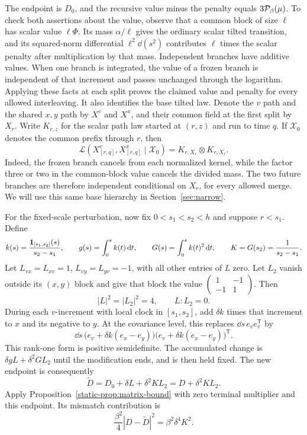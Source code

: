 The endpoint is $D_0$, and the recursive value minus the penalty equals
$3\mathcal P_\beta(\mu)$. To check both assertions about the value, observe
that a common block of size $\ell$ has scalar value $\ell\Phi$.
Its mass $\alpha/\ell$ gives the ordinary scalar tilted transition,
and its squared-norm differential $\ell^2\dd(s^2)$ contributes
$\ell$ times the scalar penalty after multiplication by that mass.
Independent branches have additive values. When one branch is
integrated, the value of a frozen branch is independent of that
increment and passes unchanged through the logarithm. Applying these
facts at each split proves the claimed value and penalty for every
allowed interleaving. It also identifies the base tilted law. Denote the $v$ path and the
shared $x,y$ path by $X^v$ and $X^x$, and their common field at the
first split by $X_r$. Write $K_{r,z}$ for the scalar path law started at $(r,z)$ and run to time $q$.
If $\mathcal X_0$ denotes the common prefix through $r$, then
\begin{equation}\label{static-eq:locking-product-law}
 \mathcal L(X^v_{[r,q]},X^x_{[r,q]}\mid\mathcal X_0)
   =K_{r,X_r}\otimes K_{r,X_r}.
\end{equation}
Indeed, the frozen branch cancels from each normalized kernel, while
the factor three or two in the common-block value cancels the divided
mass. The two future branches are therefore independent conditional on
$X_r$, for every allowed merge. We will use this same base hierarchy
in Section~\ref{sec:narrow}.

For the fixed-scale perturbation, now fix $0<s_1<s_2<h$ and suppose
$r<s_1$. Define
\[
 k(s)=\frac{\mathbf 1_{[s_1,s_2]}(s)}{s_2-s_1},\qquad
 g(s)=\int_0^s k(t)\,\mathrm d t,\qquad
 G(s)=\int_0^s k(t)^2\,\mathrm d t,\qquad
 K=G(s_2)=\frac1{s_2-s_1}.
\]
Let $L_{vx}=L_{xv}=1$, $L_{vy}=L_{yv}=-1$, with all other entries
of $L$ zero. Let $L_2$ vanish outside its $(x,y)$ block and give that
block the value
$\left(\begin{smallmatrix}1&-1\\-1&1\end{smallmatrix}\right)$.
Then
\[
 |L|^2=|L_2|^2=4,\qquad L:L_2=0.
\]
During each $v$-increment with local clock in $[s_1,s_2]$, add
$\delta k$ times that increment to $x$ and its negative to $y$.
At the covariance level, this replaces $\dd s\,e_ve_v^{\mathsf T}$ by
\[
 \dd s\,
 \bigl(e_v+\delta k(e_x-e_y)\bigr)
 \bigl(e_v+\delta k(e_x-e_y)\bigr)^{\mathsf T}.
\]
This rank-one form is positive semidefinite. The accumulated change
is $\delta gL+\delta^2GL_2$ until the modification ends, and is then
held fixed. The new endpoint is consequently
\[
 \widetilde D=D_0+\delta L+\delta^2KL_2
              =D+\delta^2KL_2.
\]
Apply Proposition~\ref{static-prop:matrix-bound} with zero terminal
multiplier and this endpoint. Its mismatch contribution is
\begin{equation}
\label{static-eq:locking-mismatch}
 \frac{\beta^2}{4}|D-\widetilde D|^2
 =\beta^2\delta^4K^2.
\end{equation}

